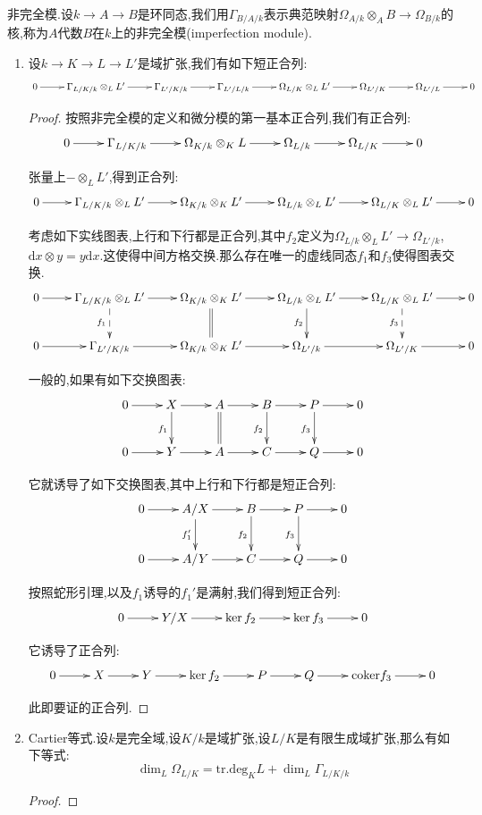 非完全模.设$k\to A\to B$是环同态,我们用$\Gamma_{B/A/k}$表示典范映射$\Omega_{A/k}\otimes_AB\to\Omega_{B/k}$的核,称为$A$代数$B$在$k$上的非完全模(imperfection module).
\begin{enumerate}
	\item 设$k\to K\to L\to L'$是域扩张,我们有如下短正合列:
	$$\xymatrix{0\ar[r]&\Gamma_{L/K/k}\otimes_LL'\ar[r]&\Gamma_{L'/K/k}\ar[r]&\Gamma_{L'/L/k}\ar[r]&\Omega_{L/K}\otimes_LL'\ar[r]&\Omega_{L'/K}\ar[r]&\Omega_{L'/L}\ar[r]&0}$$
	\begin{proof}
		
		按照非完全模的定义和微分模的第一基本正合列,我们有正合列:
		$$\xymatrix{0\ar[r]&\Gamma_{L/K/k}\ar[r]&\Omega_{K/k}\otimes_KL\ar[r]&\Omega_{L/k}\ar[r]&\Omega_{L/K}\ar[r]&0}$$
		
		张量上$-\otimes_LL'$,得到正合列:
		$$\xymatrix{0\ar[r]&\Gamma_{L/K/k}\otimes_LL'\ar[r]&\Omega_{K/k}\otimes_KL'\ar[r]&\Omega_{L/k}\otimes_LL'\ar[r]&\Omega_{L/K}\otimes_LL'\ar[r]&0}$$
		
		考虑如下实线图表,上行和下行都是正合列,其中$f_2$定义为$\Omega_{L/k}\otimes_LL'\to\Omega_{L'/k}$,$\mathrm{d}x\otimes y=y\mathrm{d}x$.这使得中间方格交换.那么存在唯一的虚线同态$f_1$和$f_3$使得图表交换.
		$$\xymatrix{0\ar[r]&\Gamma_{L/K/k}\otimes_LL'\ar[r]\ar@{-->}[d]_{f_1}&\Omega_{K/k}\otimes_KL'\ar[r]\ar@{=}[d]&\Omega_{L/k}\otimes_LL'\ar[r]\ar[d]_{f_2}&\Omega_{L/K}\otimes_LL'\ar[r]\ar@{-->}[d]_{f_3}&0\\0\ar[r]&\Gamma_{L'/K/k}\ar[r]&\Omega_{K/k}\otimes_KL'\ar[r]&\Omega_{L'/k}\ar[r]&\Omega_{L'/K}\ar[r]&0}$$
		
		一般的,如果有如下交换图表:
		$$\xymatrix{0\ar[r]&X\ar[r]\ar[d]_{f_1}&A\ar[r]\ar@{=}[d]&B\ar[r]\ar[d]_{f_2}&P\ar[r]\ar[d]_{f_3}&0\\0\ar[r]&Y\ar[r]&A\ar[r]&C\ar[r]&Q\ar[r]&0}$$
		
		它就诱导了如下交换图表,其中上行和下行都是短正合列:
		$$\xymatrix{0\ar[r]&A/X\ar[r]\ar[d]_{f_1'}&B\ar[r]\ar[d]_{f_2}&P\ar[r]\ar[d]_{f_3}&0\\0\ar[r]&A/Y\ar[r]&C\ar[r]&Q\ar[r]&0}$$
		
		按照蛇形引理,以及$f_1$诱导的$f_1'$是满射,我们得到短正合列:
		$$\xymatrix{0\ar[r]&Y/X\ar[r]&\ker f_2\ar[r]&\ker f_3\ar[r]&0}$$
		
		它诱导了正合列:
		$$\xymatrix{0\ar[r]&X\ar[r]&Y\ar[r]&\ker f_2\ar[r]&P\ar[r]&Q\ar[r]&\mathrm{coker}f_3\ar[r]&0}$$
		
		此即要证的正合列.
	\end{proof}
    \item Cartier等式.设$k$是完全域,设$K/k$是域扩张,设$L/K$是有限生成域扩张,那么有如下等式:
    $$\dim_L\Omega_{L/K}=\mathrm{tr.deg}_KL+\dim_L\Gamma_{L/K/k}$$
    \begin{proof}
    	

\end{proof}
\end{enumerate}
